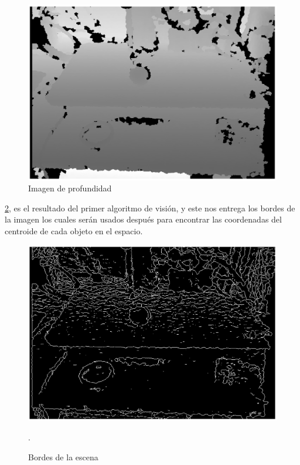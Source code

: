 \begin{figure}
	\centering
	\includegraphics[width=1.2 \linewidth]{visio/graficasderesultados/imagen1}
	\caption{Imagen de profundidad}
	\label{fig:imagen1}
\end{figure}
\cref{fig:dsobel1}, es el resultado del primer algoritmo de visión, y este nos entrega los bordes de la imagen los cuales serán usados después para encontrar las coordenadas del centroide de cada objeto en el espacio. 
\begin{figure}
	\centering
	\includegraphics[width=.9\linewidth]{visio/graficasderesultados/Dsobel1}
	\caption{Bordes de la escena}.
	\label{fig:dsobel1}
\end{figure}

